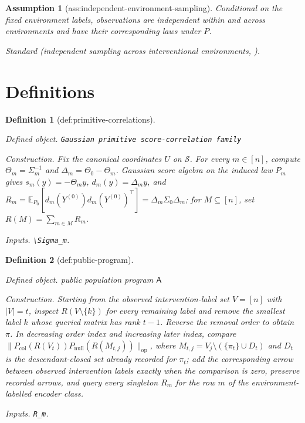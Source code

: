 \documentclass{article}
\newtheorem{assumption}{Assumption}
\newtheorem{definition}{Definition}
\begin{document}
\begin{assumption}[ass:independent-environment-sampling]\label{ass:independent-environment-sampling}
Conditional on the fixed environment labels, observations are independent within and across environments and have their corresponding laws under \(P\).
\par\smallskip\noindent\emph{Standard} (independent sampling across interventional environments, \cite{acarturk2024sample}).
\end{assumption}

\section{Definitions}

\begin{definition}[def:primitive-correlations]\label{def:primitive-correlations}
\par\smallskip\noindent\emph{Defined object.} \texttt{Gaussian primitive score-\allowbreak{}correlation family}
\par\smallskip\noindent\emph{Construction.} Fix the canonical coordinates \(U\) on \(\mathcal S\). For every \(m\in[n]\), compute \(\Theta_m=\Sigma_m^{-1}\) and \(\Delta_m=\Theta_0-\Theta_m\). Gaussian score algebra on the induced law \(P_m\) gives \(s_m(y)=-\Theta_my\), \(d_m(y)=\Delta_my\), and \(R_m=\mathbb E_{P_0}[d_m(Y^{(0)})d_m(Y^{(0)})^{\top}]=\Delta_m\Sigma_0\Delta_m\); for \(M\subseteq[n]\), set \(R(M)=\sum_{m\in M}R_m\).
\par\smallskip\noindent\emph{Inputs.} \texttt{\textbackslash{}\allowbreak{}Sigma\_\allowbreak{}m}.
\end{definition}

\begin{definition}[def:public-program]\label{def:public-program}
\par\smallskip\noindent\emph{Defined object.} public population program \(\mathsf A\)
\par\smallskip\noindent\emph{Construction.} Starting from the observed intervention-label set \(V=[n]\) with \(|V|=t\), inspect \(R(V\setminus\{k\})\) for every remaining label and remove the smallest label \(k\) whose queried matrix has rank \(t-1\). Reverse the removal order to obtain \(\pi\). In decreasing order index and increasing later index, compare \(\|P_{\operatorname{col}}(R(V_t))P_{\operatorname{null}}(R(M_{t,j}))\|_{\mathrm{op}}\), where \(M_{t,j}=V_j\setminus(\{\pi_t\}\cup D_t)\) and \(D_t\) is the descendant-closed set already recorded for \(\pi_t\); add the corresponding arrow between observed intervention labels exactly when the comparison is zero, preserve recorded arrows, and query every singleton \(R_m\) for the row \(m\) of the environment-labelled encoder class.
\par\smallskip\noindent\emph{Inputs.} \texttt{R\_\allowbreak{}m}.
\end{definition}
\end{document}
